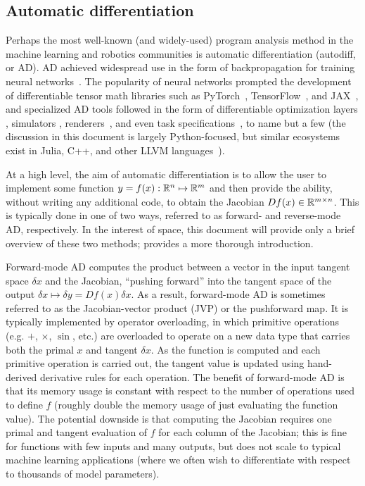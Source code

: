 \subsection{Automatic differentiation}

Perhaps the most well-known (and widely-used) program analysis method in the machine learning and robotics communities is automatic differentiation (autodiff, or AD). AD achieved widespread use in the form of backpropagation for training neural networks~\cite{rumelhartLearningRepresentationsBackpropagating1986}. The popularity of neural networks prompted the development of differentiable tensor math libraries such as PyTorch~\cite{pytorch}, TensorFlow~\cite{tensorflow2015-whitepaper}, and JAX~\cite{jax2018github}, and specialized AD tools followed in the form of differentiable optimization layers \cite{agrawalDifferentiableConvexOptimization2019}, simulators \cite{huDiffTaichiDifferentiableProgramming2019}, renderers~\cite{huDiffTaichiDifferentiableProgramming2019,lelidecDifferentiableRenderingPerturbed2021}, and even task specifications~\cite{leungBackPropagationSignalTemporal2021}, to name but a few (the discussion in this document is largely Python-focused, but similar ecosystems exist in Julia, C++, and other LLVM languages~\cite{NEURIPS2020_9332c513}).

At a high level, the aim of automatic differentiation is to allow the user to implement some function $y = f(x): \mathbb{R}^n \mapsto \mathbb{R}^m$ and then provide the ability, without writing any additional code, to obtain the Jacobian $Df(x) \in \mathbb{R}^{m\times n}$. This is typically done in one of two ways, referred to as forward- and reverse-mode AD, respectively. In the interest of space, this document will provide only a brief overview of these two methods; \cite{AutodiffCookbookJAX} provides a more thorough introduction.

Forward-mode AD computes the product between a vector in the input tangent space $\delta x$ and the Jacobian, ``pushing forward'' into the tangent space of the output $\delta x \mapsto \delta y = Df(x) \delta x$. As a result, forward-mode AD is sometimes referred to as the Jacobian-vector product (JVP) or the pushforward map. It is typically implemented by operator overloading, in which primitive operations (e.g. $+$, $\times$, $\sin$, etc.) are overloaded to operate on a new data type that carries both the primal $x$ and tangent $\delta x$. As the function is computed and each primitive operation is carried out, the tangent value is updated using hand-derived derivative rules for each operation. The benefit of forward-mode AD is that its memory usage is constant with respect to the number of operations used to define $f$ (roughly double the memory usage of just evaluating the function value). The potential downside is that computing the Jacobian requires one primal and tangent evaluation of $f$ for each column of the Jacobian; this is fine for functions with few inputs and many outputs, but does not scale to typical machine learning applications (where we often wish to differentiate with respect to thousands of model parameters).


